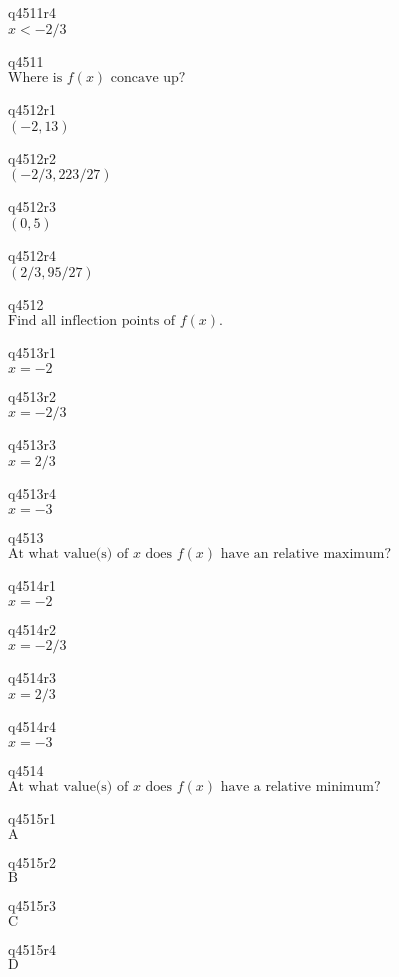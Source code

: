 q4511r4\\
\(\displaystyle x < -2/3 \)

q4511\\
\(\displaystyle \text{Where is } f(x) \text{ concave up?} \)

q4512r1\\
\(\displaystyle (-2, 13) \)

q4512r2\\
\(\displaystyle (-2/3, 223/27) \)

q4512r3\\
\(\displaystyle (0, 5) \)

q4512r4\\
\(\displaystyle (2/3, 95/27) \)

q4512\\
\(\displaystyle \text{Find all inflection points of } f(x). \)

q4513r1\\
\(\displaystyle x = -2 \)

q4513r2\\
\(\displaystyle x = -2/3 \)

q4513r3\\
\(\displaystyle x = 2/3 \)

q4513r4\\
\(\displaystyle x = -3 \)

q4513\\
\(\displaystyle \text{At what value(s) of } x \text{ does } f(x) \text{ have an relative maximum?} \)

q4514r1\\
\(\displaystyle x = -2 \)

q4514r2\\
\(\displaystyle x = -2/3 \)

q4514r3\\
\(\displaystyle x = 2/3 \)

q4514r4\\
\(\displaystyle x = -3 \)

q4514\\
\(\displaystyle \text{At what value(s) of } x \text{ does } f(x) \text{ have a relative minimum?} \)

q4515r1\\
\(\displaystyle \text{A} \)

q4515r2\\
\(\displaystyle \text{B} \)

q4515r3\\
\(\displaystyle \text{C} \)

q4515r4\\
\(\displaystyle \text{D} \)

